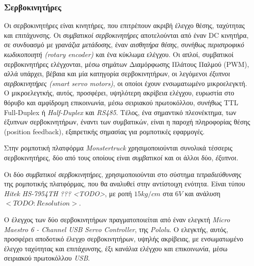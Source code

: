 \bigskip
\subsubsection{Σερβοκινητήρες}
Οι σερβοκινητήρες είναι κινητήρες, που επιτρέπουν ακριβή έλεγχο θέσης, ταχύτητας και επιτάχυνσης. Οι \textit{συμβατικοί σερβοκινητήρες} αποτελούνται από έναν DC κινητήρα, σε συνδυασμό με \textit{γρανάζια μετάδοσης}, έναν \textit{αισθητήρα θέσης}, συνήθως \textit{περιστροφικό κωδικοποιητή (rotary encoder)} και ένα κύκλωμα ελέγχου. Οι απλοί, συμβατικοί σερβοκινητήρες ελέγχονται, μέσω σημάτων Διαμόρφωσης Πλάτους Παλμού (PWM), αλλά υπάρχει, βέβαια και μία κατηγορία σερβοκινητήρων, οι λεγόμενοι \textit{έξυπνοι σερβοκινητήρες (smart servo motors)}, οι οποίοι έχουν ενσωματωμένο μικροελεγκτή. Ο μικροελεγτκής, αυτός, προσφέρει, υψηλότερη ακρίβεια ελέγχου, ευρωστία στο θόρυβο και αμφίδρομη επικοινωνία, μέσω σειριακού πρωτοκόλλου, συνήθως {TTL Full-Duplex} ή \textit{Half-Duplex} και \textit{RS485}. Τέλος, ένα σημαντικό πλεονέκτημα, των έξυπνων σερβοκινητήρων, έναντι των συμβατικών, είναι η παροχή πληροφορίας θέσης (position feedback), εξαιρετικής σημασίας για ρομποτικές εφαρμογές.

\bigskip
Στην ρομποτική πλατφόρμα \textit{Monstertruck} χρησιμοποιούνται συνολικά τέσσερις σερβοκινητήρες, δύο από τους οποίους είναι \textit{συμβατικοί} και οι άλλοι δύο, \textit{έξυπνοι}.

\bigskip
Οι δύο \textit{συμβατικοί σερβοκινητήρες}, χρησιμοποιούνται στο σύστημα \textit{τετραδιεύθυνσης} της ρομποτικής πλατφόρμας, που θα αναλυθεί στην αντίστοιχη ενότητα. Είναι τύπου \textit{Hitek HS-7954TH ??? <TODO>}, με ροπή $15kg/cm$ στα $6V$ και ανάλυση $<TODO: Resolution>$.

\bigskip
Ο έλεγχος των δύο σερβοκινητήρων πραγματοποιείται από έναν ελεγκτή \textit{Micro Maestro 6 - Channel USB Servo Controller}, της \textit{Pololu}. Ο ελεγκτής, αυτός, προσφέρει αποδοτικό έλεγχο σερβοκινητήρων, υψηλής ακρίβειας, με ενσωματωμένο έλεγχο ταχύτητας και επιτάχυνσης, έξι κανάλια ελέγχου και επικοινωνία, μέσω σειριακού πρωτοκόλλου \textit{USB}.

